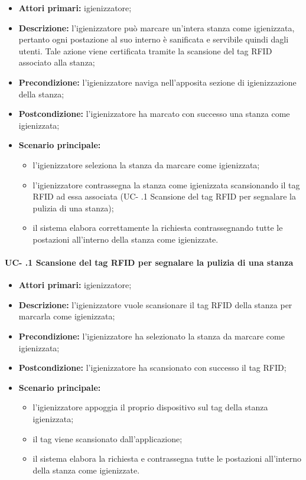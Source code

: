     \begin{itemize}
        \item \textbf{Attori primari:} igienizzatore;
        \item \textbf{Descrizione:} l’igienizzatore può marcare un'intera stanza come igienizzata, pertanto ogni postazione al suo interno è sanificata e servibile quindi dagli utenti. Tale azione viene certificata tramite la scansione del tag RFID associato alla stanza;
        \item \textbf{Precondizione:} l'igienizzatore naviga nell’apposita sezione di igienizzazione della stanza; 
        \item \textbf{Postcondizione:} l'igienizzatore ha marcato con successo una stanza come igienizzata;
        \item \textbf{Scenario principale:} 
            \begin{itemize}
                \item l'igienizzatore seleziona la stanza da marcare come igienizzata;	
                \item l'igienizzatore contrassegna la stanza come igienizzata scansionando il tag RFID ad essa associata (UC- .1 Scansione del tag RFID per segnalare la pulizia di una stanza);
                \item il sistema elabora correttamente la richiesta contrassegnando tutte le postazioni all'interno della stanza come igienizzate.
            \end{itemize}
    \end{itemize}

\paragraph{UC- .1 Scansione del tag RFID per segnalare la pulizia di una stanza}

    \begin{itemize}
        \item \textbf{Attori primari:} igienizzatore;
        \item \textbf{Descrizione:} l’igienizzatore vuole scansionare il tag RFID della stanza per marcarla come igienizzata;
        \item \textbf{Precondizione:} l'igienizzatore ha selezionato la stanza da marcare come igienizzata; 
        \item \textbf{Postcondizione:} l'igienizzatore ha scansionato con successo il tag RFID;
        \item \textbf{Scenario principale:} 
            \begin{itemize}	
                \item l'igienizzatore appoggia il proprio dispositivo sul tag della stanza igienizzata;
                \item il tag viene scansionato dall'applicazione;
                \item il sistema elabora la richiesta e contrassegna tutte le postazioni all'interno della stanza come igienizzate.
            \end{itemize}
    \end{itemize}
